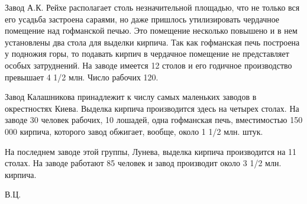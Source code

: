 Завод А.К. Рейхе располагает столь незначительной площадью, что не только вся его усадьба застроена сараями, но даже пришлось утилизировать чердачное помещение над гофманской печью. Это помещение несколько повышено и в нем установлены два стола для выделки кирпича. Так как гофманская печь построена у подножия горы, то подавать кирпич в чердачное помещение не представляет особых затруднений. На заводе имеется 12 столов и его годичное производство превышает 4 1/2 млн. Число рабочих 120.

Завод Калашникова принадлежит к числу самых маленьких заводов в окрестностях Киева. Выделка кирпича производится здесь на четырех столах. На заводе 30 человек рабочих, 10 лошадей, одна гофманская печь, вместимостью 150 000 кирпича, которого завод обжигает, вообще, около 1 1/2 млн. штук.
   
На последнем заводе этой группы, Лунева, выделка кирпича производится на 11 столах. На заводе работают 85 человек и завод производит около 3 1/2 млн. кирпича.

В.Ц.